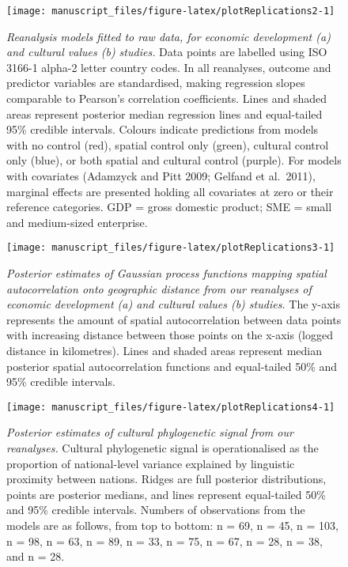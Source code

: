 \documentclass[
  man,floatsintext]{apa6}
\begin{document}
\newpage



\begin{figure}[H]
\texttt{[image: manuscript\_files/figure-latex/plotReplications2-1]} \caption{\emph{Reanalysis models fitted to raw data, for economic development (a) and cultural values (b) studies.} Data points are labelled using ISO 3166-1 alpha-2 letter country codes. In all reanalyses, outcome and predictor variables are standardised, making regression slopes comparable to Pearson's correlation coefficients. Lines and shaded areas represent posterior median regression lines and equal-tailed 95\% credible intervals. Colours indicate predictions from models with no control (red), spatial control only (green), cultural control only (blue), or both spatial and cultural control (purple). For models with covariates (Adamzyck and Pitt 2009; Gelfand et al.~2011), marginal effects are presented holding all covariates at zero or their reference categories. GDP = gross domestic product; SME = small and medium-sized enterprise.}\label{fig:plotReplications2}
\end{figure}

\newpage



\begin{figure}[H]
\texttt{[image: manuscript\_files/figure-latex/plotReplications3-1]} \caption{\emph{Posterior estimates of Gaussian process functions mapping spatial autocorrelation onto geographic distance from our reanalyses of economic development (a) and cultural values (b) studies.} The y-axis represents the amount of spatial autocorrelation between data points with increasing distance between those points on the x-axis (logged distance in kilometres). Lines and shaded areas represent median posterior spatial autocorrelation functions and equal-tailed 50\% and 95\% credible intervals.}\label{fig:plotReplications3}
\end{figure}

\newpage



\begin{figure}[H]
\texttt{[image: manuscript\_files/figure-latex/plotReplications4-1]} \caption{\emph{Posterior estimates of cultural phylogenetic signal from our reanalyses.} Cultural phylogenetic signal is operationalised as the proportion of national-level variance explained by linguistic proximity between nations. Ridges are full posterior distributions, points are posterior medians, and lines represent equal-tailed 50\% and 95\% credible intervals. Numbers of observations from the models are as follows, from top to bottom: n = 69, n = 45, n = 103, n = 98, n = 63, n = 89, n = 33, n = 75, n = 67, n = 28, n = 38, and n = 28.}\label{fig:plotReplications4}
\end{figure}
\end{document}
